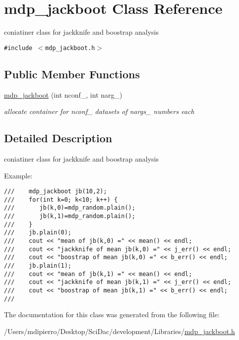 \hypertarget{classmdp__jackboot}{
\section{mdp\_\-jackboot Class Reference}
\label{classmdp__jackboot}
}
coniatiner class for jackknife and boostrap analysis  


{\tt \#include $<$mdp\_\-jackboot.h$>$}

\subsection*{Public Member Functions}
\begin{CompactItemize}
\item 
\hypertarget{classmdp__jackboot_528121e64281ffc30843b720f7c6354a}{
\hyperlink{classmdp__jackboot_528121e64281ffc30843b720f7c6354a}{mdp\_\-jackboot} (int nconf\_\-, int narg\_)}
\label{classmdp__jackboot_528121e64281ffc30843b720f7c6354a}

\begin{CompactList}\small\item\em allocate container for nconf\_\- datasets of nargs\_\- numbers each \item\end{CompactList}\end{CompactItemize}


\subsection{Detailed Description}
coniatiner class for jackknife and boostrap analysis 

Example: 

\footnotesize\begin{verbatim}
///    mdp_jackboot jb(10,2);
///    for(int k=0; k<10; k++) {       
///       jb(k,0)=mdp_random.plain();
///       jb(k,1)=mdp_random.plain();
///    }
///    jb.plain(0);
///    cout << "mean of jb(k,0) =" << mean() << endl;
///    cout << "jackknife of mean jb(k,0) =" << j_err() << endl;
///    cout << "boostrap of mean jb(k,0) =" << b_err() << endl;
///    jb.plain(1);
///    cout << "mean of jb(k,1) =" << mean() << endl;
///    cout << "jackknife of mean jb(k,1) =" << j_err() << endl;
///    cout << "boostrap of mean jb(k,1) =" << b_err() << endl;
/// \end{verbatim}
\normalsize
 

The documentation for this class was generated from the following file:\begin{CompactItemize}
\item 
/Users/mdipierro/Desktop/SciDac/development/Libraries/\hyperlink{mdp__jackboot_8h}{mdp\_\-jackboot.h}\end{CompactItemize}

